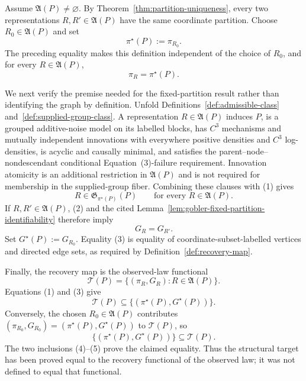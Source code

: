 Assume \(\mathfrak A(P)\neq\varnothing\). By Theorem~\ref{thm:partition-uniqueness}, every two representations \(R,R'\in\mathfrak A(P)\) have the same coordinate partition. Choose \(R_0\in\mathfrak A(P)\) and set
\[
\pi^\star(P):=\pi_{R_0}.
\]
The preceding equality makes this definition independent of the choice of \(R_0\), and for every \(R\in\mathfrak A(P)\),
\[
\pi_R=\pi^\star(P). \tag{1}
\]

We next verify the premise needed for the fixed-partition result rather than identifying the graph by definition. Unfold Definitions~\ref{def:admissible-class} and~\ref{def:supplied-group-class}. A representation \(R\in\mathfrak A(P)\) induces \(P\), is a grouped additive-noise model on its labelled blocks, has \(C^3\) mechanisms and mutually independent innovations with everywhere positive densities and \(C^3\) log-densities, is acyclic and causally minimal, and satisfies the parent--node--nondescendant conditional Equation~(3)-failure requirement. Innovation atomicity is an additional restriction in \(\mathfrak A(P)\) and is not required for membership in the supplied-group fiber. Combining these clauses with (1) gives
\[
R\in\mathfrak G_{\pi^\star(P)}(P)
\qquad\text{for every }R\in\mathfrak A(P). \tag{2}
\]
If \(R,R'\in\mathfrak A(P)\), (2) and the cited Lemma~\ref{lem:gobler-fixed-partition-identifiability} therefore imply
\[
G_R=G_{R'}. \tag{3}
\]
Set \(G^\star(P):=G_{R_0}\). Equality (3) is equality of coordinate-subset-labelled vertices and directed edge sets, as required by Definition~\ref{def:recovery-map}.

Finally, the recovery map is the observed-law functional
\[
\mathcal T(P)=\{(\pi_R,G_R):R\in\mathfrak A(P)\}.
\]
Equations (1) and (3) give
\[
\mathcal T(P)\subseteq\{(\pi^\star(P),G^\star(P))\}. \tag{4}
\]
Conversely, the chosen \(R_0\in\mathfrak A(P)\) contributes \((\pi_{R_0},G_{R_0})=(\pi^\star(P),G^\star(P))\) to \(\mathcal T(P)\), so
\[
\{(\pi^\star(P),G^\star(P))\}\subseteq\mathcal T(P). \tag{5}
\]
The two inclusions (4)--(5) prove the claimed equality. Thus the structural target has been proved equal to the recovery functional of the observed law; it was not defined to equal that functional.
